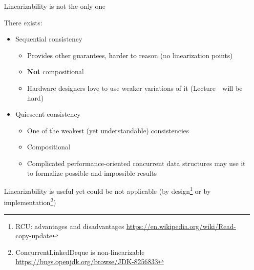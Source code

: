 \begin{frame}[fragile]{Linearizability is not the only one}

There exists:
\begin{itemize}
  \pause
  \item Sequential consistency
  \begin{itemize}
    \item Provides other guarantees, harder to reason (no linearization points)
    \item \textbf{Not} compositional
    \item Hardware designers love to use weaker variations of it (Lecture~\cacheCoherencyNum \ will be hard)    
  \end{itemize}

  \pause
  \item Quiescent consistency
  \begin{itemize}
    \item One of the weakest (yet understandable) consistencies
    \item Compositional
    \item Complicated performance-oriented concurrent data structures may use it to formalize possible and impossible results
  \end{itemize}
\end{itemize}

\pause

Linearizability is useful yet could be not applicable (by design\footnote<4->{\tiny{RCU: advantages and disadvantages \url{https://en.wikipedia.org/wiki/Read-copy-update}}} or by implementation\footnote<4->{\tiny{ConcurrentLinkedDeque is non-linearizable \url{https://bugs.openjdk.org/browse/JDK-8256833}}})

\end{frame}



